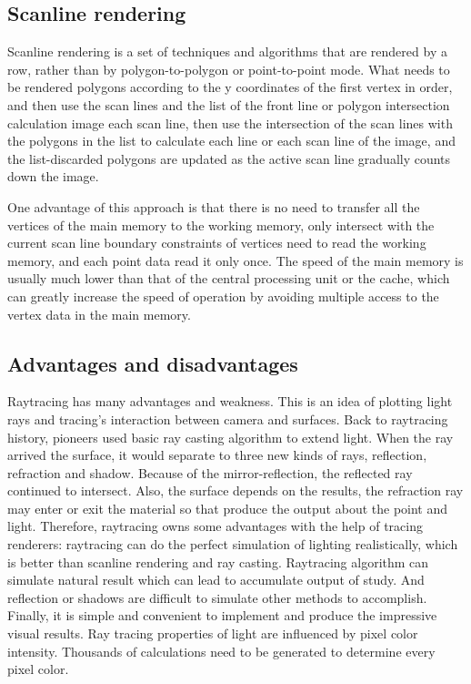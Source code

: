 \documentclass[11pt]{article}
\begin{document}
\subsection{Scanline rendering}
Scanline rendering is a set of techniques and algorithms that are rendered by a row, rather than by polygon-to-polygon or point-to-point mode. What needs to be rendered polygons according to the y coordinates of the first vertex in order, and then use the scan lines and the list of the front line or polygon intersection calculation image each scan line, then use the intersection of the scan lines with the polygons in the list to calculate each line or each scan line of the image, and the list-discarded polygons are updated as the active scan line gradually counts down the image.

One advantage of this approach is that there is no need to transfer all the vertices of the main memory to the working memory, only intersect with the current scan line boundary constraints of vertices need to read the working memory, and each point data read it only once. The speed of the main memory is usually much lower than that of the central processing unit or the cache, which can greatly increase the speed of operation by avoiding multiple access to the vertex data in the main memory.

\subsection{Advantages and disadvantages}
Raytracing has many advantages and weakness. This is an idea of plotting light rays and tracing’s interaction between camera and surfaces. Back to raytracing history, pioneers used basic ray casting algorithm to extend light. When the ray arrived the surface, it would separate to three new kinds of rays, reflection, refraction and shadow. Because of the mirror-reflection, the reflected ray continued to intersect. Also, the surface depends on the results, the refraction ray may enter or exit the material so that produce the output about the point and light. Therefore, raytracing owns some advantages with the help of tracing renderers: raytracing can do the perfect simulation of lighting realistically, which is better than scanline rendering and ray casting. Raytracing algorithm can simulate natural result which can lead to accumulate output of study. And reflection or shadows are difficult to simulate other methods to accomplish. Finally, it is simple and convenient to implement and produce the impressive visual results. Ray tracing properties of light are influenced by pixel color intensity. Thousands of calculations need to be generated to determine every pixel color. 
\end{document}
